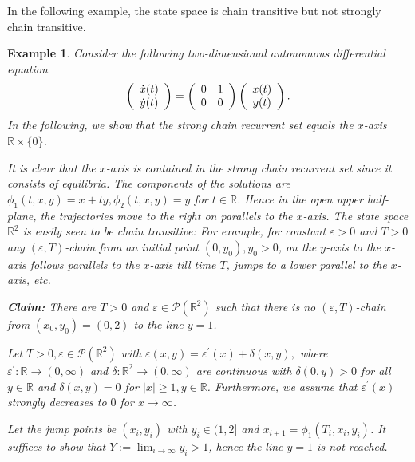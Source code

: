 \documentclass[preprint,12pt]{elsarticle}
\newtheorem{example}{Example}
\begin{document}
In the following example, the state space is chain transitive but not strongly
chain transitive.

\begin{example}
\label{Example_strong}Consider the following two-dimensional autonomous
differential equation%
\[
\left(
\begin{array}
[c]{c}%
\dot{x}(t)\\
\dot{y}(t)
\end{array}
\right)  =\left(
\begin{array}
[c]{cc}%
0 & 1\\
0 & 0
\end{array}
\right)  \left(
\begin{array}
[c]{c}%
x(t)\\
y(t)
\end{array}
\right)  .
\]
In the following, we show that the strong chain recurrent set equals the
$x$-axis $\mathbb{R}\times\{0\}$.

It is clear that the $x$-axis is contained in the strong chain recurrent set
since it consists of equilibria. The components of the solutions are $\phi
_{1}(t,x,y)=x+ty,\phi_{2}(t,x,y)=y$ for $t\in\mathbb{R}$. Hence in the open
upper half-plane, the trajectories move to the right on parallels to the
$x$-axis. The state space $\mathbb{R}^{2}$ is easily seen to be chain
transitive: For example, for constant $\varepsilon>0$ and $T>0$ any
$(\varepsilon,T)$-chain from an initial point $(0,y_{0}),y_{0}>0$, on the
$y$-axis to the $x$-axis follows parallels to the $x$-axis till time $T$,
jumps to a lower parallel to the $x$-axis, etc.

\textbf{Claim:} There are $T>0$ and $\varepsilon\in\mathcal{P}(\mathbb{R}%
^{2})$ such that there is no $(\varepsilon,T)$-chain from $(x_{0}%
,y_{0})=(0,2)$ to the line $y=1$.

Let $T>0,\varepsilon\in\mathcal{P}(\mathbb{R}^{2})$ with $\varepsilon
(x,y)=\varepsilon^{\prime}(x)+\delta(x,y),$ where $\varepsilon^{\prime
}:\mathbb{R}\rightarrow(0,\infty)$ and $\delta:\mathbb{R}^{2}\rightarrow
(0,\infty)$ are continuous with $\delta(0,y)>0$ for all $y\in\mathbb{R}$ and
$\delta(x,y)=0$ for $\left\vert x\right\vert \geq1,y\in\mathbb{R}$.
Furthermore, we assume that $\varepsilon^{\prime}(x)$ strongly decreases to
$0$ for $x\rightarrow\infty$.

Let the jump points be $(x_{i},y_{i})$ with $y_{i}\in(1,2]$ and $x_{i+1}%
=\phi_{1}(T_{i},x_{i},y_{i})$. It suffices to show that $Y:=\lim
_{i\rightarrow\infty}y_{i}>1$, hence the line $y=1$ is not reached.


\end{example}
\end{document}
